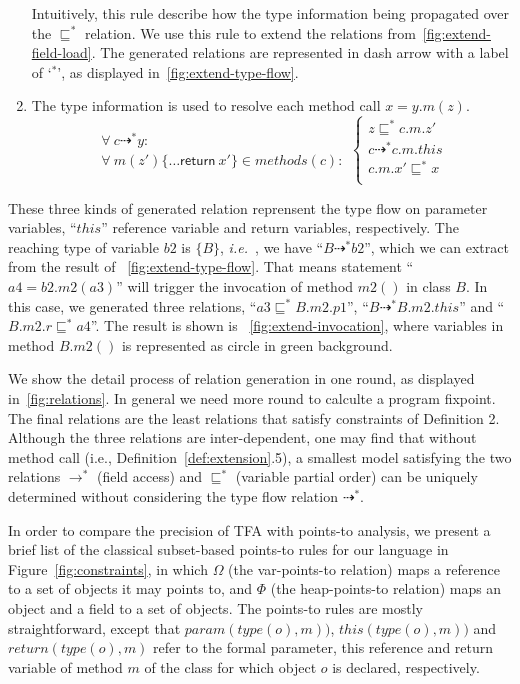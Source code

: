 \documentclass{fac}
\newcommand\ie{\textit{i.e.\ }}
\newcommand{\keyword}[1]{\mathsf{#1}}
\newcommand{\kw}[1]{\keyword{#1}}
\newcommand{\VPT}{\Omega}
\newcommand{\HPT}{\Phi}
\newcommand{\less}{\sqsubseteq}
\newcommand{\tflow}{\dashrightarrow}
\begin{document}
\begin{enumerate}
  Intuitively, this rule describe how the type information being propagated over the $\less^*$ relation. We use this rule to extend the relations from~\ref{fig:extend-field-load}. The generated relations are represented in dash arrow with a label of `$^*$', as displayed in~\ref{fig:extend-type-flow}.

  \item The type information is used to resolve each method call $x = y.m(z)$.
  \begin{equation*}
  \left.\begin{array}{l}\forall\ c\tflow^* y:\\ \forall\ m(z')\{\dots \kw{return}\ x'\}\in methods(c):\end{array}\right.\left\{\begin{array}{l}
        z\less^* c.m.z'\\
        c\tflow^* c.m.this\\
        c.m.x'\less^* x \\
        \end{array}\right.
  \end{equation*}
\end{enumerate}

These three kinds of generated relation reprensent the type flow on parameter variables, ``$this$'' reference variable and return variables, respectively.
The reaching type of variable $b2$ is $\{B\}$, \ie, we have ``$B \tflow^* b2$'', which we can extract from the result of ~\ref{fig:extend-type-flow}. That means statement ``$a4=b2.m2(a3)$'' will trigger the invocation of method $m2()$ in class $B$. In this case, we generated three relations, ``$a3 \less^* B.m2.p1$'', ``$B \tflow^* B.m2.this$'' and ``$B.m2.r \less^* a4$''. The result is shown is ~\ref{fig:extend-invocation}, where variables in method $B.m2()$ is represented as circle in green background.

We show the detail process of relation generation in one round, as displayed in~\ref{fig:relations}. In general we need more round to calculte a program fixpoint. The final relations are the least relations that satisfy constraints of Definition 2. Although the three relations are inter-dependent, one may find that without method call (i.e., Definition~\ref{def:extension}.5), a smallest model satisfying the two relations $\rightarrow^*$ (field access) and $\less^*$ (variable partial order) can be uniquely determined without considering the type flow relation $\tflow^*$.

In order to compare the precision of TFA with points-to analysis, we present a brief list of the classical subset-based points-to rules for our language in Figure~\ref{fig:constraints}, in which $\VPT$ (the var-points-to relation) maps a reference to a set of objects it may points to, and $\HPT$ (the heap-points-to relation) maps an object and a field to a set of objects. The points-to rules are mostly straightforward, except that %
$param(type(o),m))$, $this(type(o),m))$ and $return(type(o),m)$ refer to the formal parameter, \textsf{this} reference and \textsf{return} variable of method $m$ of the class for which object $o$ is declared, respectively.
\end{document}
